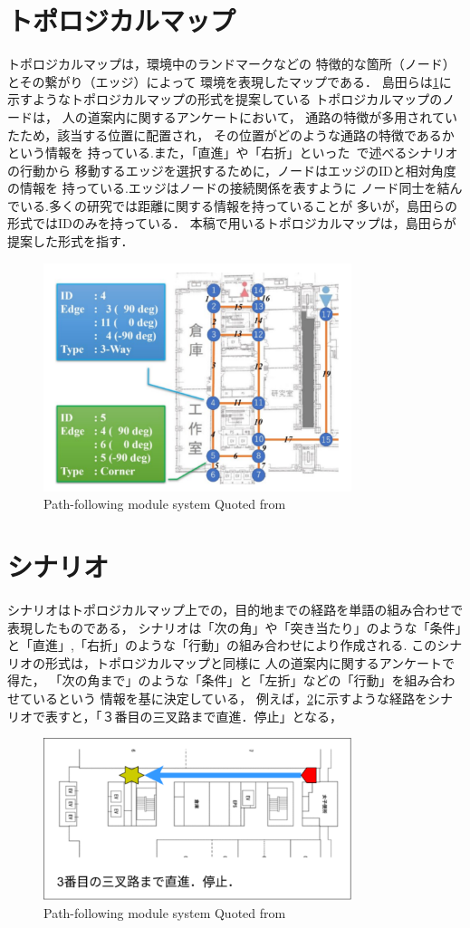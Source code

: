 \section{トポロジカルマップ}
トポロジカルマップは，環境中のランドマークなどの
特徴的な箇所（ノード）とその繋がり（エッジ）によって
環境を表現したマップである．
島田らは\ref{fig:topo}に示すようなトポロジカルマップの形式\cite{shimada2020}を提案している
トポロジカルマップのノードは，
人の道案内に関するアンケートにおいて，
通路の特徴が多用されていたため，該当する位置に配置され，
その位置がどのような通路の特徴であるかという情報を
持っている.また，「直進」や「右折」といった~で述べるシナリオの行動から
移動するエッジを選択するために，ノードはエッジのIDと相対角度の情報を
持っている.エッジはノードの接続関係を表すように
ノード同士を結んでいる.多くの研究では距離に関する情報を持っていることが
多いが，島田らの形式ではIDのみを持っている．
本稿で用いるトポロジカルマップは，島田らが提案した形式を指す．
\begin{figure}[htbp]
    \centering
     \includegraphics[width=90mm]{images/pdf/topo.pdf}
     \caption{Path-following module system Quoted from\cite{shimada2020}}
     \label{fig:topo}
\end{figure}
\newpage
\section{シナリオ}
シナリオはトポロジカルマップ上での，目的地までの経路を単語の組み合わせで表現したものである，
シナリオは「次の角」や「突き当たり」のような「条件」と「直進」,「右折」のような「行動」の組み合わせにより作成される.
このシナリオの形式は，トポロジカルマップと同様に
人の道案内に関するアンケートで得た，
「次の角まで」のような「条件」と「左折」などの「行動」を組み合わせているという
情報を基に決定している，
例えば，\ref{fig:scenario01}に示すような経路をシナリオで表すと，「３番目の三叉路まで直進．停止」となる，
\begin{figure}[htbp]
    \centering
     \includegraphics[width=90mm]{images/pdf/scenario/scenario01.pdf}
     \caption{Path-following module system Quoted from\cite{shimada2020}}
     \label{fig:scenario01}
\end{figure}